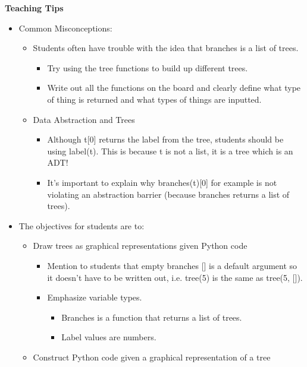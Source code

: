 \begin{blocksection}
	\begin{guide}
	\textbf{Teaching Tips}
	\begin{itemize}
			\item Common Misconceptions:
			\begin{itemize}
				\item Students often have trouble with the idea that branches is a list of trees.
				\begin{itemize}
					\item Try using the tree functions to build up different trees.
					\item Write out all the functions on the board and clearly define what type of thing is returned and what types of things are inputted.
				\end{itemize}
				\item Data Abstraction and Trees
				\begin{itemize}
					\item Although t[0] returns the label from the tree, students should be using label(t). This is because t is not a list, it is a tree which is an ADT!
					\item It’s important to explain why branches(t)[0] for example is not violating an abstraction barrier (because branches returns a list of trees).
				\end{itemize}
			\end{itemize}
			\item The objectives for students are to:
			\begin{itemize}
				\item Draw trees as graphical representations given Python code
				\begin{itemize}
					\item Mention to students that empty branches [] is a default argument so it doesn’t have to be written out, i.e. tree(5) is the same as tree(5, []).
					\item Emphasize variable types.
					\begin{itemize}
						\item Branches is a function that returns a list of trees.
						\item Label values are numbers.
					\end{itemize}
				\end{itemize}
				\item Construct Python code given a graphical representation of a tree
			\end{itemize}
	\end{itemize}
	\end{guide}
\end{blocksection}
